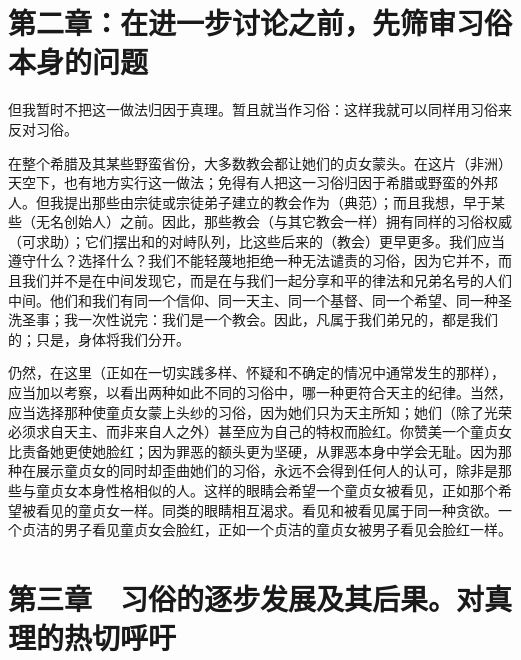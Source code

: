 
\section{第二章：在进一步讨论之前，先筛审习俗本身的问题}

但我暂时不把这一做法归因于真理。暂且就当作习俗：这样我就可以同样用习俗来反对习俗。\par

在整个希腊及其某些野蛮省份，大多数教会都让她们的贞女蒙头。在这片（非洲）天空下，也有地方实行这一做法；免得有人把这一习俗归因于希腊或野蛮的外邦人。但我提出那些由宗徒或宗徒弟子建立的教会作为（典范）；而且我想，早于某些（无名创始人）之前。因此，那些教会（与其它教会一样）拥有同样的习俗权威（可求助）；它们摆出和的对峙队列，比这些后来的（教会）更早更多。我们应当遵守什么？选择什么？我们不能轻蔑地拒绝一种无法谴责的习俗，因为它并不，而且我们并不是在中间发现它，而是在与我们一起分享和平的律法和兄弟名号的人们中间。他们和我们有同一个信仰、同一天主、同一个基督、同一个希望、同一种圣洗圣事；我一次性说完：我们是一个教会。因此，凡属于我们弟兄的，都是我们的；只是，身体将我们分开。\par

仍然，在这里（正如在一切实践多样、怀疑和不确定的情况中通常发生的那样），应当加以考察，以看出两种如此不同的习俗中，哪一种更符合天主的纪律。当然，应当选择那种使童贞女蒙上头纱的习俗，因为她们只为天主所知；她们（除了光荣必须求自天主、而非来自人之外）甚至应为自己的特权而脸红。你赞美一个童贞女比责备她更使她脸红；因为罪恶的额头更为坚硬，从罪恶本身中学会无耻。因为那种在展示童贞女的同时却歪曲她们的习俗，永远不会得到任何人的认可，除非是那些与童贞女本身性格相似的人。这样的眼睛会希望一个童贞女被看见，正如那个希望被看见的童贞女一样。同类的眼睛相互渴求。看见和被看见属于同一种贪欲。一个贞洁的男子看见童贞女会脸红，正如一个贞洁的童贞女被男子看见会脸红一样。\par


\section{第三章　习俗的逐步发展及其后果。对真理的热切呼吁}


